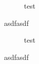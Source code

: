 \documentclass{article}
\begin{document}
\begin{figure}

\caption{test}
\end{figure}
asdfasdf
\begin{figure}

\caption{test}
\end{figure}
asdfasdf
\end{document}
